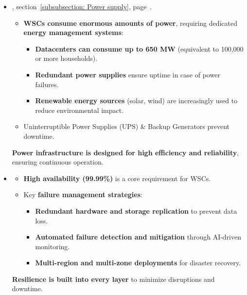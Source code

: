 \begin{itemize}
	\item {}, section~\ref{subsubsection: Power supply}, page~\pageref{subsubsection: Power supply}.
    \begin{itemize}
        \item \textbf{WSCs consume enormous amounts of power}, requiring dedicated \textbf{energy management systems}:
        \begin{itemize}
        	\item \textbf{Datacenters can consume up to 650 MW} (equivalent to 100,000 or more households).
        	\item \textbf{Redundant power supplies} ensure uptime in case of power failures.
        	\item \textbf{Renewable energy sources} (solar, wind) are increasingly used to reduce environmental impact.
        \end{itemize}
        \item Uninterruptible Power Supplies (UPS) \& Backup Generators prevent downtime.
    \end{itemize}
	\textbf{Power infrastructure is designed for high efficiency and reliability}, ensuring continuous operation.
	
	\item {}
    \begin{itemize}
        \item \textbf{High availability (99.99\%)} is a core requirement for WSCs.
        \item Key \textbf{failure management strategies}:
        \begin{itemize}
        	\item \textbf{Redundant hardware and storage replication} to prevent data loss.
        	\item \textbf{Automated failure detection and mitigation} through AI-driven monitoring.
        	\item \textbf{Multi-region and multi-zone deployments} for disaster recovery.
        \end{itemize}
    \end{itemize}
    \textbf{Resilience is built into every layer} to minimize disruptions and downtime.
\end{itemize}